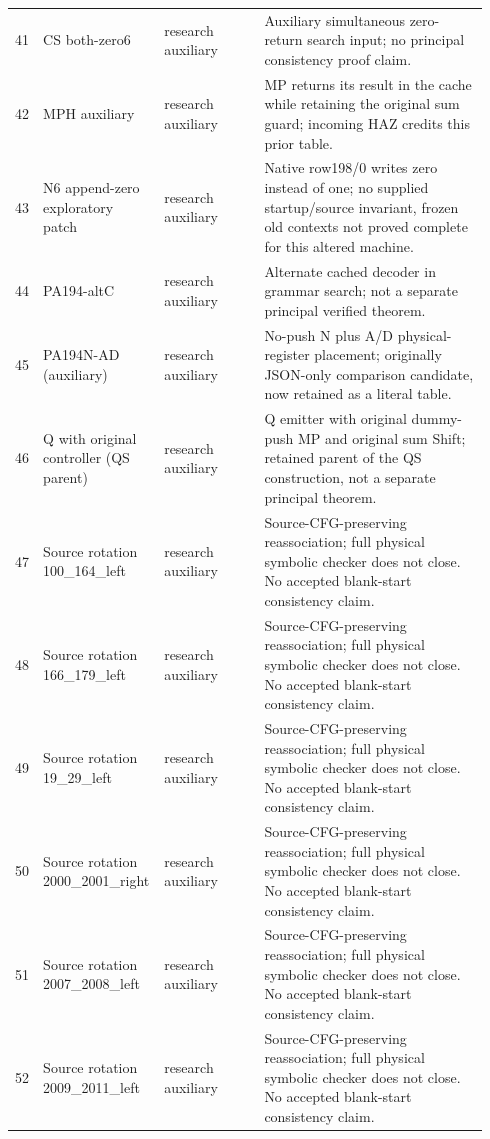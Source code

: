 \begin{longtable}{p{0.035\linewidth}p{0.23\linewidth}p{0.21\linewidth}p{0.47\linewidth}}
41 & CS both-zero6 & research auxiliary & Auxiliary simultaneous zero-return search input; no principal consistency proof claim.\\[4pt]
42 & MPH auxiliary & research auxiliary & MP returns its result in the cache while retaining the original sum guard; incoming HAZ credits this prior table.\\[4pt]
43 & N6 append-zero exploratory patch & research auxiliary & Native row198/0 writes zero instead of one; no supplied startup/source invariant, frozen old contexts not proved complete for this altered machine.\\[4pt]
44 & PA194-altC & research auxiliary & Alternate cached decoder in grammar search; not a separate principal verified theorem.\\[4pt]
45 & PA194N-AD (auxiliary) & research auxiliary & No-push N plus A/D physical-register placement; originally JSON-only comparison candidate, now retained as a literal table.\\[4pt]
46 & Q with original controller (QS parent) & research auxiliary & Q emitter with original dummy-push MP and original sum Shift; retained parent of the QS construction, not a separate principal theorem.\\[4pt]
47 & Source rotation 100\_164\_left & research auxiliary & Source-CFG-preserving reassociation; full physical symbolic checker does not close. No accepted blank-start consistency claim.\\[4pt]
48 & Source rotation 166\_179\_left & research auxiliary & Source-CFG-preserving reassociation; full physical symbolic checker does not close. No accepted blank-start consistency claim.\\[4pt]
49 & Source rotation 19\_29\_left & research auxiliary & Source-CFG-preserving reassociation; full physical symbolic checker does not close. No accepted blank-start consistency claim.\\[4pt]
50 & Source rotation 2000\_2001\_right & research auxiliary & Source-CFG-preserving reassociation; full physical symbolic checker does not close. No accepted blank-start consistency claim.\\[4pt]
51 & Source rotation 2007\_2008\_left & research auxiliary & Source-CFG-preserving reassociation; full physical symbolic checker does not close. No accepted blank-start consistency claim.\\[4pt]
52 & Source rotation 2009\_2011\_left & research auxiliary & Source-CFG-preserving reassociation; full physical symbolic checker does not close. No accepted blank-start consistency claim.\\[4pt]

\end{longtable}

